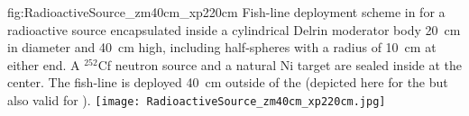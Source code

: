 \begin{dunefigure}
{fig:RadioactiveSource_zm40cm_xp220cm}
{Fish-line deployment scheme in  for a radioactive source encapsulated inside a cylindrical Delrin moderator body \SI{20}{\cm} in diameter and \SI{40}{\cm} high, including half-spheres with a radius of \SI{10}{\cm} at either end. A $^{252}$Cf neutron source and a natural Ni target are sealed inside at the center. The fish-line is deployed \SI{40}{\cm} outside of the   (depicted here for the  but also valid for ).
}
\texttt{[image: RadioactiveSource\_zm40cm\_xp220cm.jpg]}
\end{dunefigure}




